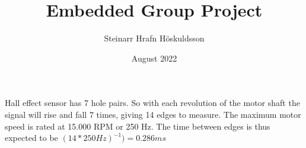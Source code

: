 \documentclass{article}
\title{Embedded Group Project}
\author{Steinarr Hrafn Höskuldsson}
\date{August 2022}
\begin{document}
\maketitle

\section{}
Hall effect sensor has 7 hole pairs. So with each revolution of the motor shaft the signal will rise and fall 7 times, giving 14 edges to measure. The maximum motor speed is rated at 15.000 RPM or 250 Hz. The time between edges is thus expected to be \((14*250Hz)^{-1}) = 0.286 ms\)
\end{document}
